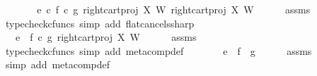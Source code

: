 \begin{isabellebody}
\ \ \isamarkupfalse%
\ \isamarkupfalse%
\ {\isachardoublequoteopen}{\isachardot}{\kern0pt}{\isachardot}{\kern0pt}{\isachardot}{\kern0pt}\ {\isacharequal}{\kern0pt}\ {\isacharparenleft}{\kern0pt}e\isactrlsup {\isasymflat}\ {\isasymcirc}\isactrlsub c\ {\isasymlangle}{\isacharparenleft}{\kern0pt}f\isactrlsup {\isasymflat}\ {\isasymcirc}\isactrlsub c\ {\isasymlangle}g\isactrlsup {\isasymflat}{\isacharcomma}{\kern0pt}\ right{\isacharunderscore}{\kern0pt}cart{\isacharunderscore}{\kern0pt}proj\ X\ W{\isasymrangle}{\isacharparenright}{\kern0pt}\isactrlsup {\isasymsharp}\isactrlsup {\isasymflat}\ {\isacharcomma}{\kern0pt}right{\isacharunderscore}{\kern0pt}cart{\isacharunderscore}{\kern0pt}proj\ X\ W{\isasymrangle}{\isacharparenright}{\kern0pt}\isactrlsup {\isasymsharp}{\isachardoublequoteclose}\isanewline
\ \ \ \ \isamarkupfalse%
\ assms\ \isamarkupfalse%
\ {\isacharparenleft}{\kern0pt}typecheck{\isacharunderscore}{\kern0pt}cfuncs{\isacharcomma}{\kern0pt}\ simp\ add{\isacharcolon}{\kern0pt}\ flat{\isacharunderscore}{\kern0pt}cancels{\isacharunderscore}{\kern0pt}sharp{\isacharparenright}{\kern0pt}\isanewline
\ \ \isamarkupfalse%
\ \isamarkupfalse%
\ {\isachardoublequoteopen}{\isachardot}{\kern0pt}{\isachardot}{\kern0pt}{\isachardot}{\kern0pt}\ {\isacharequal}{\kern0pt}\ e\ {\isasymbox}\ {\isacharparenleft}{\kern0pt}f\isactrlsup {\isasymflat}\ {\isasymcirc}\isactrlsub c\ {\isasymlangle}g\isactrlsup {\isasymflat}{\isacharcomma}{\kern0pt}\ right{\isacharunderscore}{\kern0pt}cart{\isacharunderscore}{\kern0pt}proj\ X\ W{\isasymrangle}{\isacharparenright}{\kern0pt}\isactrlsup {\isasymsharp}{\isachardoublequoteclose}\isanewline
\ \ \ \ \isamarkupfalse%
\ assms\ \isamarkupfalse%
\ {\isacharparenleft}{\kern0pt}typecheck{\isacharunderscore}{\kern0pt}cfuncs{\isacharcomma}{\kern0pt}\ simp\ add{\isacharcolon}{\kern0pt}\ meta{\isacharunderscore}{\kern0pt}comp{}{\isacharunderscore}{\kern0pt}def{}{\isacharparenright}{\kern0pt}\isanewline
\ \ \isamarkupfalse%
\ \isamarkupfalse%
\ {\isachardoublequoteopen}{\isachardot}{\kern0pt}{\isachardot}{\kern0pt}{\isachardot}{\kern0pt}\ {\isacharequal}{\kern0pt}\ e\ {\isasymbox}\ {\isacharparenleft}{\kern0pt}f\ {\isasymbox}\ g{\isacharparenright}{\kern0pt}{\isachardoublequoteclose}\isanewline
\ \ \ \ \isamarkupfalse%
\ assms\ \isamarkupfalse%
\ {\isacharparenleft}{\kern0pt}simp\ add{\isacharcolon}{\kern0pt}\ meta{\isacharunderscore}{\kern0pt}comp{}{\isacharunderscore}{\kern0pt}def{}{\isacharparenright}{\kern0pt}\isanewline

\end{isabellebody}
